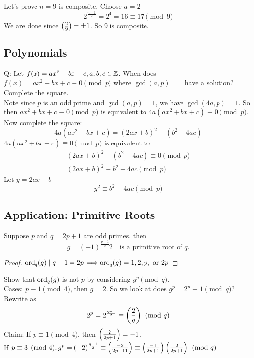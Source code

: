     \begin{example}
        Let's prove $n=9$ is composite. 
        Choose $a=2$
        \[
            2^{\frac{n-1}{2}} = 2^4 = 16 \equiv 17\pmod{9}
        \]
        We are done since $\left( \frac{2}{9} \right)  = \pm 1$. So 9 is composite. \\
    \end{example}
    
    \subsection{Polynomials}
    Q: Let $f(x) = ax^2+bx+c, a,b,c\in\mathbb{Z}$. 
    When does $f(x) = ax^2+bx+c\equiv 0\pmod{p}$ where $\gcd(a,p)=1$ have a solution?
    Complete the square. \\
    Note since $p$ is an odd prime and $\gcd(a,p) = 1$, we have $\gcd(4a,p) = 1$.
    So then $ax^2+bx+c\equiv 0\pmod{p}$ is equivalent to 
    $4a(ax^2+bx+c) \equiv 0 \pmod{p}$. \\
    Now complete the square:
    \[
        4a(ax^2+bx+c) = (2ax+b)^2 - (b^2-4ac)
    \]
    $4a(ax^2+bx+c)\equiv 0\pmod{p}$ is equivalent to 
    \begin{align*}
        (2ax+b)^2 - (b^2-4ac)\equiv 0\pmod{p} \\
        (2ax+b)^2\equiv b^2-4ac\pmod{p}
    \end{align*}
    Let $y = 2ax+b$
    \[
        y^2\equiv b^2-4ac\pmod{p}
    \]

    \subsection{Application: Primitive Roots}
    \begin{theorem}
        Suppose $p$ and $q=2p+1$ are odd primes. then
        \[
            g= (-1)^{\frac{p-1}{2}}2 \quad\text{is a primitive root of $q$.}
        \]
        \begin{proof}
            $\operatorname{ord}_q(g)\mid q-1 = 2p$ 
            $\Longrightarrow \operatorname{ord}_q(g) = 1,2,p,\text{ or }2p$
        \end{proof}
        Show that $\operatorname{ord}_q(g)$ is not $p$ by considering $g^p\pmod{q}$. \\
        Cases: $p\equiv 1\pmod{4}$, then $g=2$. So we look at does $g^p=2^p\equiv 1\pmod{q}$? \\
        Rewrite as 
        \[2^p = 2^{\frac{q-1}{2}}\equiv\left( \frac{2}{q} \right) \pmod{q}\] 
        Claim: If $p\equiv 1\pmod{4}$, then $\left( \frac{2}{2p+1} \right)  = -1$. \\
        If $p\equiv 3\pmod{4}, g^p = (-2)^{\frac{q-1}{2}}\equiv \left( \frac{-2}{2p+11} \right) \equiv\left( \frac{-1}{2p+1} \right) \left( \frac{2}{2p+1} \right) \pmod{q}$
    \end{theorem}